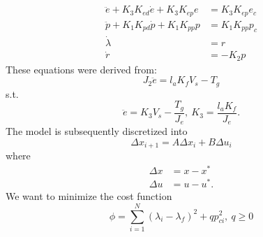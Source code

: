 \begin{subequations}
\label{eq:model_al}
\begin{align}
	\ddot{e} + K_{3} K_{ed} \dot{e} + K_{3} K_{ep} e &= K_{3} K_{ep} e_{c} \label{eq:model_se_al_elev} \\
	\ddot{p} + K_{1} K_{pd} \dot{p} + K_{1} K_{pp} p &= K_{1} K_{pp} p_{c} \label{eq:model_se_al_pitch} \\
	\dot{\lambda} &= r \label{eq:model_se_al_lambda} \\
	\dot{r} &= -K_{2} p \label{eq:model_se_al_r} 
\end{align}
\end{subequations}
These equations were derived from: 
\begin{equation}
	J_{2} \ddot{e} = l_{a} K_{f} V_{s} - T_{g}
	\end{equation}
s.t.
\begin{equation*}
\ddot{e}=K_{3} V_{s}-\frac{T_{g}}{J_{e}},\: K_{3}=\frac{l_{a}K_{f}}{J_{e}}.
\end{equation*}
The model is subsequently discretized into
\begin{equation*}
\Delta x_{i+1}=A\Delta x_{i} + B\Delta u_{i}
\end{equation*} 	
where
\begin{align}
\Delta x &= x -x^* \\
\Delta u &= u -u^*.
\end{align}
We want to minimize the cost function 
\begin{equation}
\phi = \sum_{i=1}^{N}(\lambda_{i}-\lambda_{f})^2+qp_{ci}^{2},\:q\geq 0
\end{equation}
